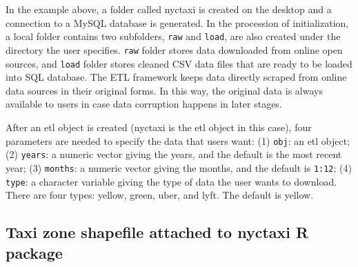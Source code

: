 \documentclass[12pt,twoside]{reedthesis}
\theoremstyle{definition}
\theoremstyle{definition}
\theoremstyle{definition}
\theoremstyle{remark}
\begin{document}
In the example above, a folder called nyctaxi is created on the desktop
and a connection to a MySQL database is generated. In the procession of
initialization, a local folder contains two subfolders, \texttt{raw} and
\texttt{load}, are also created under the directory the user specifies.
\texttt{raw} folder stores data downloaded from online open sources, and
\texttt{load} folder stores cleaned CSV data files that are ready to be
loaded into SQL database. The ETL framework keeps data directly scraped
from online data sources in their original forms. In this way, the
original data is always available to users in case data corruption
happens in later stages.

After an etl object is created (nyctaxi is the etl object in this case),
four parameters are needed to specify the data that users want: (1)
\texttt{obj}: an etl object; (2) \texttt{years}: a numeric vector giving
the years, and the default is the most recent year; (3) \texttt{months}:
a numeric vector giving the months, and the default is \texttt{1:12};
(4) \texttt{type}: a character variable giving the type of data the user
wants to download. There are four types: yellow, green, uber, and lyft.
The default is yellow.

\subsection{Taxi zone shapefile attached to nyctaxi R
package}\label{taxi-zone-shapefile-attached-to-nyctaxi-r-package}
\end{document}
